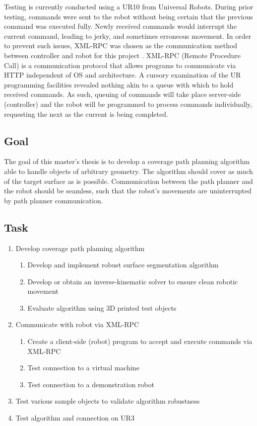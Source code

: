 \documentclass[a4paper, 10pt]{article}
\begin{document}
Testing is currently conducted using a UR10 from Universal Robots.
During prior testing, commands were sent to the robot without being certain that the previous command was executed fully.
Newly received commands would interrupt the current command, leading to jerky, and sometimes erroneous movement.
In order to prevent such issues, XML-RPC was chosen as the communication method between controller and robot for this project \cite{UR_XML-RPC}.
XML-RPC (Remote Procedure Call) is a communication protocol that allows programs to communicate via HTTP independent of OS and architecture.
A cursory examination of the UR programming facilities revealed nothing akin to a queue with which to hold received commands.
As such, queuing of commands will take place server-side (controller) and the robot will be programmed to process commands individually, requesting the next as the current is being completed.

\begin{flushleft}
	\section*{Goal}
	The goal of this master's thesis is to develop a coverage path planning algorithm able to handle objects of arbitrary geometry.
	The algorithm should cover as much of the target surface as is possible.
	Communication between the path planner and the robot should be seamless, such that the robot's movements are uninterrupted by path planner communication.
\end{flushleft}
\begin{flushleft}
	\section*{Task}
	\begin{enumerate}
		\item Develop coverage path planning algorithm
		\begin{enumerate}
			\item Develop and implement robust surface segmentation algorithm
			\item Develop or obtain an inverse-kinematic solver to ensure clean robotic movement
			\item Evaluate algorithm using 3D printed test objects
		\end{enumerate}
		\item Communicate with robot via XML-RPC
		\begin{enumerate}
			\item Create a client-side (robot) program to accept and execute commands via XML-RPC
			\item Test connection to a virtual machine
			\item Test connection to a demonstration robot
		\end{enumerate}
		\item Test various sample objects to validate algorithm robustness
		\item Test algorithm and connection on UR3
	\end{enumerate}
\end{flushleft}
\printbibliography
\end{document}
